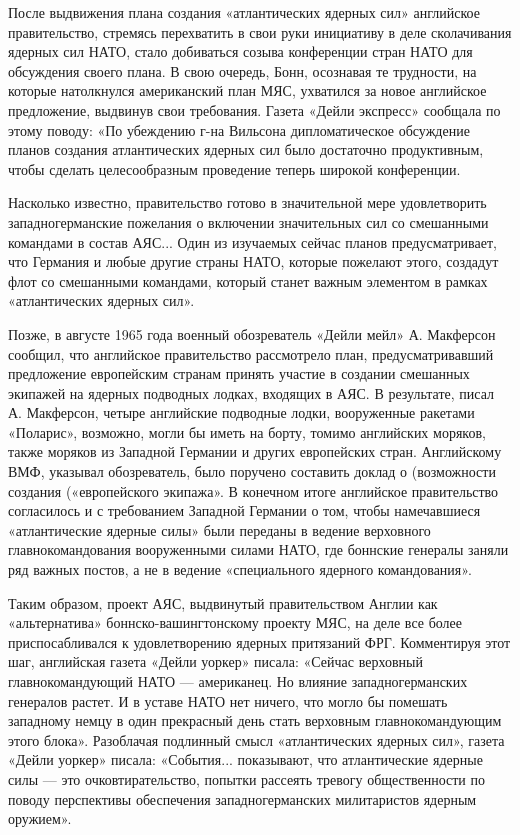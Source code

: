 \documentclass[12pt, a4paper, openany]{book}
\begin{document}
		После выдвижения плана создания «атлантических ядерных сил» английское правительство, стремясь перехватить в свои руки инициативу в деле сколачивания ядерных сил НАТО, стало добиваться созыва конференции стран НАТО для обсуждения своего плана. В свою очередь, Бонн, осознавая те трудности, на которые натолкнулся американский план МЯС, ухватился за новое английское предложение, выдвинув свои требования. Газета «Дейли экспресс» сообщала по этому поводу: «По убеждению г-на Вильсона дипломатическое обсуждение планов создания атлантических ядерных сил было достаточно продуктивным, чтобы сделать целесообразным проведение теперь широкой конференции.
		
		Насколько известно, правительство готово в значительной мере удовлетворить западногерманские пожелания о включении значительных сил со смешанными командами в состав АЯС... Один из изучаемых сейчас планов предусматривает, что Германия и любые другие страны НАТО, которые пожелают этого, создадут флот со смешанными командами, который станет важным элементом в рамках «атлантических ядерных сил».
		
		Позже, в августе 1965 года военный обозреватель «Дейли мейл» А. Макферсон сообщил, что английское правительство рассмотрело план, предусматривавший предложение европейским странам принять участие в создании смешанных экипажей на ядерных подводных лодках, входящих в АЯС. В результате, писал А. Макферсон, четыре английские подводные лодки, вооруженные ракетами «Поларис», возможно, могли бы иметь на борту, томимо английских моряков, также моряков из Западной Германии и других европейских стран. Английскому ВМФ, указывал обозреватель, было поручено составить доклад о (возможности создания («европейского экипажа». В конечном итоге английское правительство согласилось и с требованием Западной Германии о том, чтобы намечавшиеся «атлантические ядерные силы» были переданы в ведение верховного главнокомандования вооруженными силами НАТО, где боннские генералы заняли ряд важных постов, а не в ведение «специального ядерного командования».
		
		Таким образом, проект АЯС, выдвинутый правительством Англии как «альтернатива» боннско-вашингтонскому проекту МЯС, на деле все более приспосабливался к удовлетворению ядерных притязаний ФРГ. Комментируя этот шаг, английская газета «Дейли уоркер» писала: «Сейчас верховный главнокомандующий НАТО — американец. Но влияние западногерманских генералов растет. И в уставе НАТО нет ничего, что могло бы помешать западному немцу в один прекрасный день стать верховным главнокомандующим этого блока». Разоблачая подлинный смысл «атлантических ядерных сил», газета «Дейли уоркер» писала: «События... показывают, что атлантические ядерные силы — это очковтирательство, попытки рассеять тревогу общественности по поводу перспективы обеспечения западногерманских милитаристов ядерным оружием».
		
\end{document}
